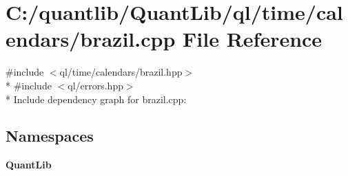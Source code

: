 \section{C\+:/quantlib/\+Quant\+Lib/ql/time/calendars/brazil.cpp File Reference}
\label{brazil_8cpp}
{\ttfamily \#include $<$ql/time/calendars/brazil.\+hpp$>$}\\*
{\ttfamily \#include $<$ql/errors.\+hpp$>$}\\*
Include dependency graph for brazil.\+cpp\+:
\subsection*{Namespaces}
\begin{DoxyCompactItemize}
\item 
 {\bf Quant\+Lib}
\end{DoxyCompactItemize}
